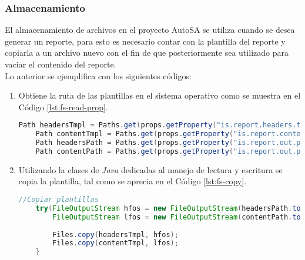 \subsubsection{Almacenamiento}
El almacenamiento de archivos en el proyecto AutoSA se utiliza cuando se desea generar un reporte, para esto es necesario contar con la plantilla del reporte y copiarla a un archivo nuevo con el fin de que posteriormente sea utilizado para vaciar el contenido del reporte.\\
Lo anterior se ejemplifica con los siguientes códigos:
\begin{enumerate}
	\item Obtiene la ruta de las plantillas en el sistema operativo como se muestra en el Código \ref{lst:fs-read-prop}.
	\begin{lstlisting}[language=Java, caption={Obtención de las rutas de las plantillas.}, captionpos=b, label={lst:fs-read-prop}]
	Path headersTmpl = Paths.get(props.getProperty("is.report.headers.tmpl"));
	Path contentTmpl = Paths.get(props.getProperty("is.report.content.tmpl"));
	Path headersPath = Paths.get(props.getProperty("is.report.out.path"), headersTmpl.getFileName().toString());
	Path contentPath = Paths.get(props.getProperty("is.report.out.path"), contentTmpl.getFileName().toString());
	\end{lstlisting}

	\item Utilizando la clases de \textit{Java} dedicadas al manejo de lectura y escritura se copia la plantilla, tal como se aprecia en el Código \ref{lst:fs-copy}.
	\begin{lstlisting}[language=Java, caption={Copia de archivos.}, captionpos=b, label={lst:fs-copy}]
	//Copiar plantillas
	try(FileOutputStream hfos = new FileOutputStream(headersPath.toFile(), false);
		FileOutputStream lfos = new FileOutputStream(contentPath.toFile(), false)){
		
		Files.copy(headersTmpl, hfos);
		Files.copy(contentTmpl, lfos);
	}
	\end{lstlisting}
\end{enumerate}
